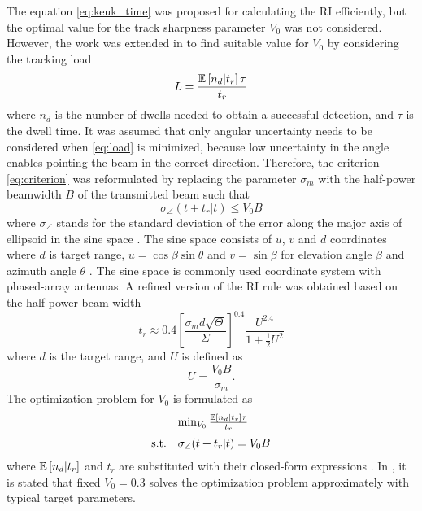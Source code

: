 \documentclass[english, 12pt, a4paper, elec, utf8, a-1b, online]{aaltothesis}
\newcommand{\E}[1]{\mathbb{E}\left[ #1 \right]}
\newcommand{\ri}{t_r}
\begin{document}
The equation \eqref{eq:keuk_time} was proposed for calculating the RI efficiently, but the optimal value for the track sharpness parameter $V_0$ was not considered.
However, the work was extended in \cite{vanKeuk1993} to find suitable value for $V_0$ by considering the tracking load
\begin{equation}\label{eq:load}
    L = \frac{\E{\ndwells | \ri} \tau}{\ri}
\end{equation}
where $n_d$ is the number of dwells needed to obtain a successful detection, and $\tau$ is the dwell time.
It was assumed that only angular uncertainty needs to be considered when \eqref{eq:load} is minimized, 
because low uncertainty in the angle enables pointing the beam in the correct direction.
Therefore, the criterion \eqref{eq:criterion} was reformulated by replacing the parameter $\sigma_m$ with the half-power beamwidth $B$ of the transmitted beam such that
\begin{equation} \label{eq:criterion2}
    \sigma_\angle(t + \ri | t) \leq V_0 B
\end{equation}
where $\sigma_\angle$ stands for the standard deviation of the error along the major axis of ellipsoid in the sine space \cite{vanKeuk1993}.
The sine space consists of $u$, $v$ and $d$ coordinates where $d$ is target range, $u=\cos \beta \sin \theta$ and $v=\sin \beta$ for elevation angle $\beta$ and azimuth angle $\theta$ \cite{Mailloux2017}.
The sine space is commonly used coordinate system with phased-array antennas.
A refined version of the RI rule was obtained based on the half-power beam width
\begin{equation}\label{eq:van_keuk_revisited}
    \ri \approx 0.4 \left[ \frac{\sigma_m d \sqrt{\Theta}}{\Sigma} \right]^{0.4} \frac{U^{2.4}}{1+\frac{1}{2}U^2}
\end{equation}
where $d$ is the target range, and $U$ is defined as
\begin{equation}
    U = \frac{V_0 B}{\sigma_m}.
\end{equation}
The optimization problem for $V_0$ is formulated as 
\begin{equation}
\begin{array}{ll}
     & \min_{V_0} \frac{\E{\ndwells | \ri} \tau}{\ri} \\ [7pt]
    \text{s.t.} & \sigma_\angle(t + \ri | t) = V_0 B
\end{array}
\end{equation}
where $\E{\ndwells | \ri}$ and $\ri$ are substituted with their closed-form expressions \cite{vanKeuk1993}.
In \cite{vanKeuk1993}, it is stated that fixed $V_0=0.3$ solves the optimization problem approximately with typical target parameters.
\end{document}
